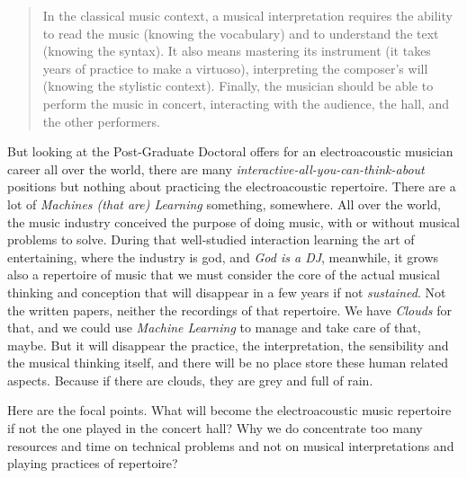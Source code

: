 \documentclass[twoside,a4paper]{article}
\begin{document}
\begin{quote}
In the classical music context, a musical interpretation requires the ability to read the music (knowing the vocabulary) and to understand the text (knowing the syntax). It also means mastering its instrument (it takes years of practice to make a virtuoso), interpreting the composer’s will (knowing the stylistic context). Finally, the musician should be able to perform the music in concert, interacting with the audience, the hall, and the other performers\cite{lem16}.
\end{quote}

But looking at the Post-Graduate Doctoral offers for an electroacoustic musician career all over the world, there are many \emph{interactive-all-you-can-think-about} positions but nothing about practicing the electroacoustic repertoire. There are a lot of \emph{Machines (that are) Learning} something, somewhere. All over the world, the music industry conceived the purpose of doing music, with or without musical problems to solve. During that well-studied interaction learning the art of entertaining, where the industry is god, and \emph{God is a DJ}, meanwhile, it grows also a repertoire of music that we must consider the core of the actual musical thinking and conception that will disappear in a few years if not \emph{sustained}. Not the written papers, neither the recordings of that repertoire. We have \emph{Clouds} for that, and we could use \emph{Machine Learning} to manage and take care of that, maybe. But it will disappear the practice, the interpretation, the sensibility and the musical thinking itself, and there will be no place store these human related aspects. Because if there are clouds, they are grey and full of rain.


Here are the focal points. %
What will become the electroacoustic music repertoire if not the one played in the concert hall? Why we do concentrate too many resources and time on technical problems and not on musical interpretations and playing practices of repertoire?

\end{document}
